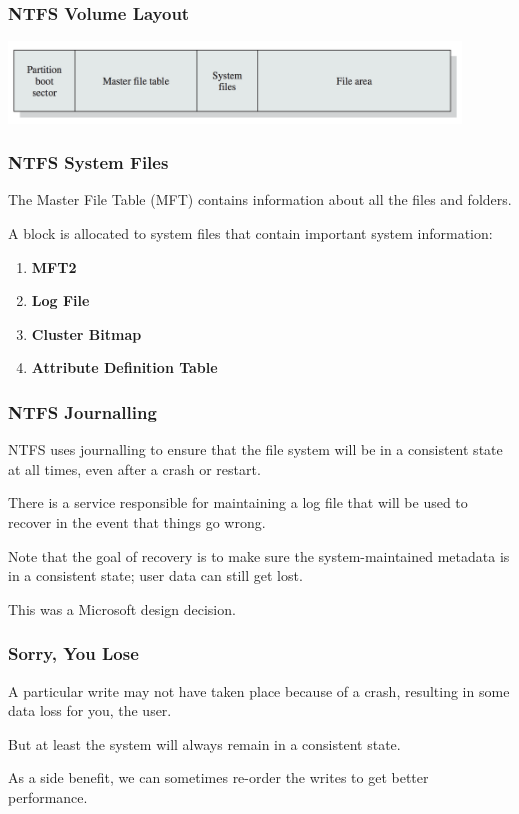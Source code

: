 \begin{frame}
\frametitle{NTFS Volume Layout}

\begin{center}
	\includegraphics[width=0.9\textwidth]{images/ntfs-volume.png}
\end{center}

\end{frame}

\begin{frame}
\frametitle{NTFS System Files}

The Master File Table (MFT) contains information about all the files and folders. 

A block is allocated to system files that contain important system information:

\begin{enumerate}
	\item \textbf{MFT2}
	\item \textbf{Log File}
	\item \textbf{Cluster Bitmap}
	\item \textbf{Attribute Definition Table}
\end{enumerate}
\end{frame}


\begin{frame}
\frametitle{NTFS Journalling}

NTFS uses journalling to ensure that the file system will be in a consistent state at all times, even after a crash or restart. 

There is a service responsible for maintaining a log file that will be used to recover in the event that things go wrong.  

Note that the goal of recovery is to make sure the system-maintained metadata is in a consistent state; user data can still get lost. 

This was a Microsoft design decision.

\end{frame}


\begin{frame}
\frametitle{Sorry, You Lose}

A particular write may not have taken place because of a crash, resulting in some data loss for you, the user. 

But at least the system will always remain in a consistent state. 

As a side benefit, we can sometimes re-order the writes to get better performance. 


\end{frame}


